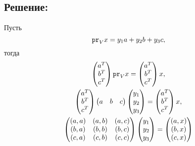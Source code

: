 \documentclass[12pt]{article}
\begin{document}
    \subsection*{Решение:}
    Пусть
    \[
        \texttt{pr}_{V} {x} = y_1 a + y_2 b + y_3 c,
    \]
    тогда
    \begin{gather*}
        \begin{pmatrix}
            a^T \\
            b^T \\
            c^T
        \end{pmatrix}
        \texttt{pr}_{V} {x}
        =
        \begin{pmatrix}
            a^T \\
            b^T \\
            c^T
        \end{pmatrix}
        x , \\
        \begin{pmatrix}
            a^T \\
            b^T \\
            c^T
        \end{pmatrix}
        \begin{pmatrix}
            a & b & c
        \end{pmatrix}
        \begin{pmatrix}
            y_1 \\
            y_2 \\
            y_3
        \end{pmatrix}
        =
        \begin{pmatrix}
            a^T \\
            b^T \\
            c^T
        \end{pmatrix}
        x , \\
        \begin{pmatrix}
            \left ( a, a \right ) & \left ( a, b \right ) & \left ( a, c \right ) \\
            \left ( b, a \right ) & \left ( b, b \right ) & \left ( b, c \right ) \\
            \left ( c, a \right ) & \left ( c, b \right ) & \left ( c, c \right ) \\
        \end{pmatrix}
        \begin{pmatrix}
            y_1 \\
            y_2 \\
            y_3
        \end{pmatrix}
        =
        \begin{pmatrix}
            \left ( a, x \right ) \\
            \left ( b, x \right ) \\
            \left ( c, x \right )
        \end{pmatrix}
    \end{gather*}
\end{document}
